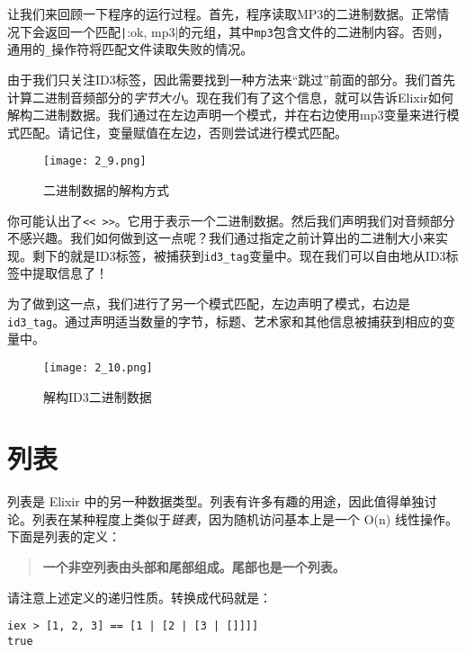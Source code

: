 让我们来回顾一下程序的运行过程。首先，程序读取MP3的二进制数据。正常情况下会返回一个匹配\texttt|{:ok, mp3}|的元组，其中\texttt{mp3}包含文件的二进制内容。否则，通用的\texttt{\_}操作符将匹配文件读取失败的情况。

由于我们只关注ID3标签，因此需要找到一种方法来``跳过''前面的部分。我们首先计算二进制音频部分的\emph{字节大小}。现在我们有了这个信息，就可以告诉Elixir如何解构二进制数据。我们通过在左边声明一个模式，并在右边使用mp3变量来进行模式匹配。请记住，变量赋值在左边，否则尝试进行模式匹配。

\begin{figure}[!ht]
    \centering
    \texttt{[image: 2\_9.png]}
    \caption{二进制数据的解构方式}
    \label{fig:2_9}
\end{figure}

你可能认出了\texttt{<< >>}。它用于表示一个二进制数据。然后我们声明我们对音频部分不感兴趣。我们如何做到这一点呢？我们通过指定之前计算出的二进制大小来实现。剩下的就是ID3标签，被捕获到\texttt{id3\_tag}变量中。现在我们可以自由地从ID3标签中提取信息了！

为了做到这一点，我们进行了另一个模式匹配，左边声明了模式，右边是\texttt{id3\_tag}。通过声明适当数量的字节，标题、艺术家和其他信息被捕获到相应的变量中。

\begin{figure}[!ht]
    \centering
    \texttt{[image: 2\_10.png]}
    \caption{解构ID3二进制数据}
    \label{fig:2_10}
\end{figure}

\section{列表}

列表是 Elixir
中的另一种数据类型。列表有许多有趣的用途，因此值得单独讨论。列表在某种程度上类似于\emph{链表}，因为随机访问基本上是一个
O(n) 线性操作。下面是列表的定义：

\begin{quote}
\textbf{一个非空列表由头部和尾部组成。尾部也是一个列表。}
\end{quote}

请注意上述定义的递归性质。转换成代码就是：

\begin{code}{}
\begin{verbatim}
iex > [1, 2, 3] == [1 | [2 | [3 | []]]]
true
\end{verbatim}
\end{code}

